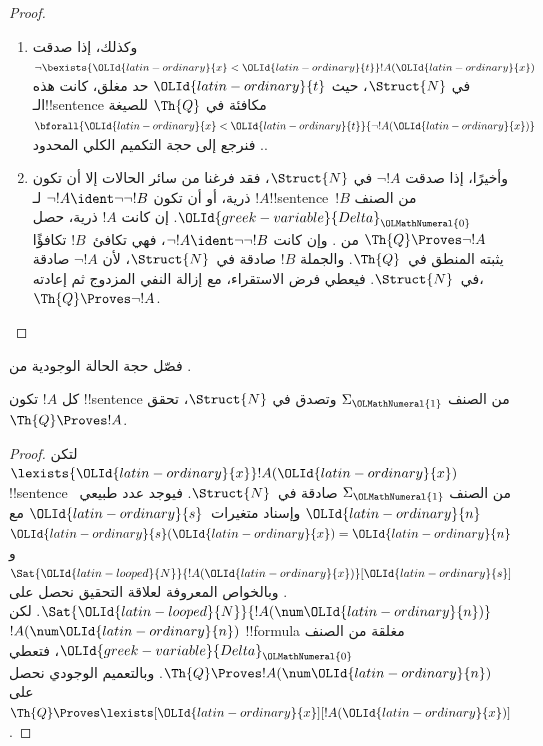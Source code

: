 \documentclass[../../../include/open-logic-section]{subfiles}
\begin{document}
\begin{proof}
\begin{enumerate}
$\Struct{N}$، حيث $\OLId{latin-ordinary}{t}$ حد مغلق، كانت هذه الـ!!{sentence}
مكافئة للـ!!{sentence} $\bexists{\OLId{latin-ordinary}{x}<\OLId{latin-ordinary}{t}}{\lnot !A(\OLId{latin-ordinary}{x})}$،
والتكافؤ قابل للاشتقاق في~$\Th{Q}$.
فنرجع إلى حجة التكميم الوجودي المحدود.
%
\item وكذلك، إذا صدقت $\lnot\bexists{\OLId{latin-ordinary}{x}<\OLId{latin-ordinary}{t}}!A(\OLId{latin-ordinary}{x})$ في
$\Struct{N}$، حيث $\OLId{latin-ordinary}{t}$ حد مغلق، كانت هذه الـ!!{sentence} مكافئة في
$\Th{Q}$ للصيغة $\bforall{\OLId{latin-ordinary}{x}<\OLId{latin-ordinary}{t}}{\lnot !A(\OLId{latin-ordinary}{x})}$.
فنرجع إلى حجة التكميم الكلي المحدود.
%
\item وأخيرًا، إذا صدقت $\lnot !A$ في $\Struct{N}$،
فقد فرغنا من سائر الحالات إلا أن تكون $!A$ ذرية، أو أن تكون
$\lnot !A\ident\lnot\lnot !B$ لـ!!{sentence}~$!B$
من الصنف $\OLId{greek-variable}{Delta}_\OLMathNumeral{0}$.
إن كانت $!A$ ذرية، حصل $\Th{Q}\Proves\lnot !A$
من .
وإن كانت $\lnot !A\ident\lnot\lnot !B$،
فهي تكافئ~$!B$ تكافؤًا يثبته المنطق في~$\Th{Q}$.
والجملة $!B$ صادقة في~$\Struct{N}$، لأن
$\lnot !A$ صادقة في~$\Struct{N}$.
فيعطي فرض الاستقراء، مع إزالة النفي المزدوج ثم إعادته،
$\Th{Q}\Proves\lnot !A$.
\end{enumerate}
\end{proof}

\begin{prob}
فصّل حجة الحالة الوجودية من
.
\end{prob}

\begin{thm}
كل $!A$ تكون !!{sentence} من الصنف $\Sigma_\OLMathNumeral{1}$ وتصدق في
$\Struct{N}$، تحقق $\Th{Q}\Proves !A$.
\end{thm}

\begin{proof}
لتكن $\lexists{\OLId{latin-ordinary}{x}}!A(\OLId{latin-ordinary}{x})$ !!{sentence} من الصنف $\Sigma_\OLMathNumeral{1}$
صادقة في~$\Struct{N}$. فيوجد عدد طبيعي~$\OLId{latin-ordinary}{n}$ وإسناد متغيرات~$\OLId{latin-ordinary}{s}$
مع $\OLId{latin-ordinary}{s}(\OLId{latin-ordinary}{x})=\OLId{latin-ordinary}{n}$ و$\Sat{\OLId{latin-looped}{N}}{!A(\OLId{latin-ordinary}{x})}[\OLId{latin-ordinary}{s}]$.
وبالخواص المعروفة لعلاقة التحقيق نحصل على
$\Sat{\OLId{latin-looped}{N}}{!A(\num \OLId{latin-ordinary}{n})}$.
لكن $!A(\num \OLId{latin-ordinary}{n})$ !!{formula} مغلقة من الصنف $\OLId{greek-variable}{Delta}_\OLMathNumeral{0}$،
فتعطي 
$\Th{Q}\Proves !A(\num \OLId{latin-ordinary}{n})$.
وبالتعميم الوجودي نحصل على
$\Th{Q}\Proves\lexists[\OLId{latin-ordinary}{x}][!A(\OLId{latin-ordinary}{x})]$.
\end{proof}
\end{document}
